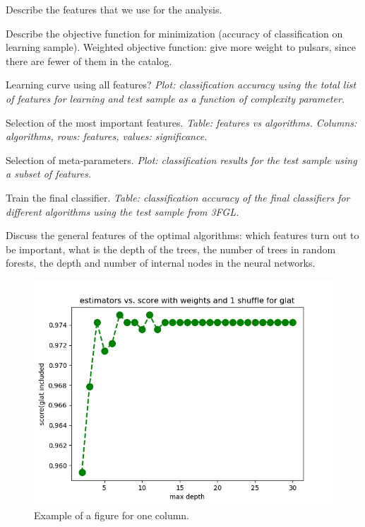 \ben
\item
Describe the features that we use for the analysis.
\item
Describe the objective function for minimization (accuracy of classification on learning sample).
Weighted objective function: give more weight to pulsars, since there are fewer of them in the catalog.
\item
Learning curve using all features?
{\it Plot: classification accuracy using the total list of features for learning and test sample as a function of complexity parameter.}
\item
Selection of the most important features.
{\it Table: features vs algorithms. Columns: algorithms, rows: features, values: significance.}
\item
Selection of meta-parameters.
{\it Plot: classification results for the test sample using a subset of features.}
\item
Train the final classifier.
{\it Table: classification accuracy of the final classifiers for different algorithms using the test sample from 3FGL.}
\een

Discuss the general features of the optimal algorithms: which features turn out to be important, what is the depth of the trees, the number of trees in random forests, the depth and number of internal nodes in the neural networks. 

\begin{figure}[h]
\includegraphics[width=\onepic\textwidth]{plots/Rf_maxdepth_oobscore_glat}
\caption{
Example of a figure for one column.
}
\label{fig:Maps_data}
\end{figure}


